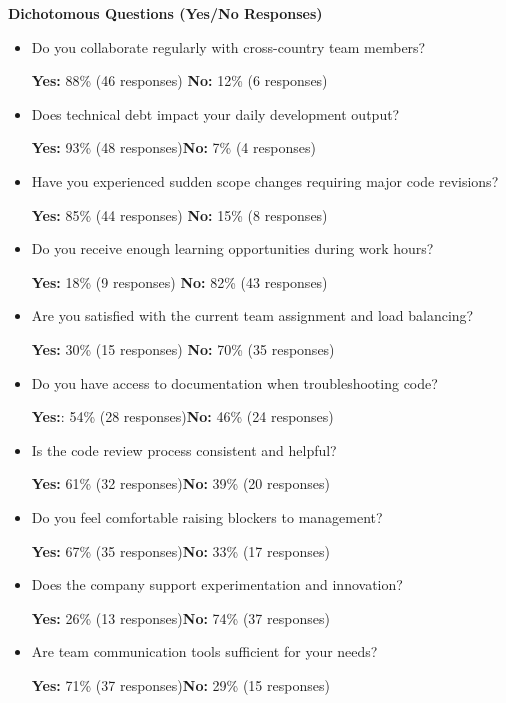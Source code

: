 \documentclass[12pt,a4paper,oneside]{book}
\begin{document}
\textbf{Dichotomous Questions (Yes/No Responses)}\\
\begin{itemize}
  \item Do you collaborate regularly with cross-country team members?
  
  \textbf{Yes:} 88\% (46 responses) \quad \textbf{No:} 12\% (6 responses)

  \item Does technical debt impact your daily development output?
  
  \textbf{Yes:} 93\% (48 responses)\quad \textbf{No:} 7\% (4 responses)

  \item Have you experienced sudden scope changes requiring major code revisions?
  
  \textbf{Yes:} 85\% (44 responses) \quad  \textbf{No:} 15\% (8 responses)
 
  \item Do you receive enough learning opportunities during work hours?
  
  \textbf{Yes:} 18\% (9 responses) \quad \textbf{No:} 82\% (43 responses)

  \item Are you satisfied with the current team assignment and load balancing?
  
  \textbf{Yes:} 30\% (15 responses) \quad \textbf{No:} 70\% (35 responses)

  \item Do you have access to documentation when troubleshooting code?
  
  \textbf{Yes:}: 54\% (28 responses)\quad \textbf{No:} 46\% (24 responses)

  \item Is the code review process consistent and helpful?
  
  \textbf{Yes:} 61\% (32 responses)\quad \textbf{No:} 39\% (20 responses)

  \item Do you feel comfortable raising blockers to management?
  
  \textbf{Yes:} 67\% (35 responses)\quad \textbf{No:} 33\% (17 responses)

  \item Does the company support experimentation and innovation?
  
  \textbf{Yes:} 26\% (13 responses)\quad \textbf{No:} 74\% (37 responses)

  \item Are team communication tools sufficient for your needs?
  
  \textbf{Yes:} 71\% (37 responses)\quad \textbf{No:} 29\% (15 responses)
\end{itemize}
\end{document}
